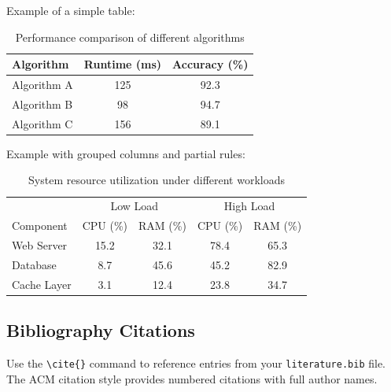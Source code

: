 Example of a simple table:

\begin{table}[htbp]
    \centering
    \caption{Performance comparison of different algorithms}
    \label{tab:performance}
    \begin{tabular}{lcc}
        \toprule
        Algorithm   & Runtime (ms) & Accuracy (\%) \\
        \midrule
        Algorithm A & 125          & 92.3          \\
        Algorithm B & 98           & 94.7          \\
        Algorithm C & 156          & 89.1          \\
        \bottomrule
    \end{tabular}
\end{table}

Example with grouped columns and partial rules:

\begin{table}[htbp]
    \centering
    \caption{System resource utilization under different workloads}
    \label{tab:resources}
    \begin{tabular}{lcccc}
        \toprule
                    & \multicolumn{2}{c}{Low Load} & \multicolumn{2}{c}{High Load}                       \\
        \cmidrule(lr){2-3} \cmidrule(lr){4-5}
        Component   & CPU (\%)                     & RAM (\%)                      & CPU (\%) & RAM (\%) \\
        \midrule
        Web Server  & 15.2                         & 32.1                          & 78.4     & 65.3     \\
        Database    & 8.7                          & 45.6                          & 45.2     & 82.9     \\
        Cache Layer & 3.1                          & 12.4                          & 23.8     & 34.7     \\
        \bottomrule
    \end{tabular}
\end{table}

\subsection{Bibliography Citations}

Use the \verb+\cite{}+ command to reference entries from your \verb+literature.bib+ file. The ACM citation style provides numbered citations with full author names.

